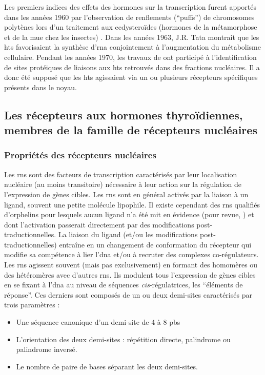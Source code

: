 \documentclass[../main.tex]{subfiles}
\begin{document}
	Les premiers indices des effets des hormones sur la transcription furent apportés dans les années 1960 par l'observation de renflements (``puffs'') de chromosomes polytènes lors d'un traitement aux ecdysteroïdes (hormones de la métamorphose et de la mue chez les insectes) \citep{Clever1960}.
	Dans les années 1963, J.R. Tata montrait que les \glspl{ht} favorisaient la synthèse d'\gls{rna} conjointement à l'augmentation du métabolisme cellulaire.
	Pendant les années 1970, les travaux de \citet{Samuels1973} ont participé à l'identification de sites protéiques de liaisons aux \glspl{ht} retrouvés dans des fractions nucléaires. Il a donc été supposé que les \glspl{ht} agissaient via un ou plusieurs récepteurs spécifiques présents dans le noyau.


	\subsection{Les récepteurs aux hormones thyroïdiennes, membres de la famille de récepteurs nucléaires}\label{subsubsec:TR}

		\subsubsection{Propriétés des récepteurs nucléaires}
			Les \glspl{rn} sont des facteurs de transcription caractérisés par leur localisation nucléaire (au moins transitoire) nécessaire à leur action sur la régulation de l'expression de gènes cibles.
			Les \glspl{rn} sont en général activés par la liaison à un ligand, souvent une petite molécule lipophile.
			Il existe cependant des \glspl{rn} qualifiés d'orphelins pour lesquels aucun ligand n'a été mit en évidence (pour revue, \citealp{Giguere1999}) et dont l'activation passerait directement par des modifications post-traductionnelles.
			La liaison du ligand (et/ou les modifications post-traductionnelles) entraîne en un changement de conformation du récepteur qui modifie sa compétence à lier l'\gls{dna} et/ou à recruter des complexes co-régulateurs.
			Les \glspl{rn} agissent souvent (mais pas exclusivement) en formant des homomères ou des hétéromères avec d'autres \glspl{rn}.
			Ils modulent tous l'expression de gènes cibles en se fixant à l'\gls{dna} au niveau de séquences \textit{cis}-régulatrices, les ``éléments de réponse''.
			Ces derniers sont composés de un ou deux demi-sites caractérisés par trois paramètres :
			\begin{itemize}
				\item Une séquence canonique d'un demi-site de 4 à 8 \glspl{pb}
				\item L'orientation des deux demi-sites : répétition directe, palindrome ou palindrome inversé.	
				\item Le nombre de paire de bases séparant les deux demi-sites.
			\end{itemize}
\end{document}
